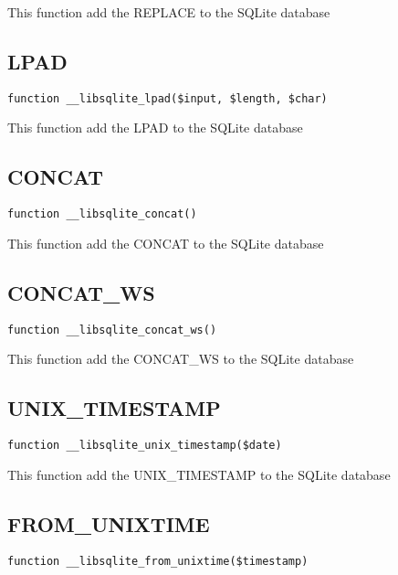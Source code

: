 \documentclass[a4paper]{book}
\begin{document}
This function add the REPLACE to the SQLite database

\hypertarget{toc334}{}
\subsection{LPAD}

\begin{lstlisting}
function __libsqlite_lpad($input, $length, $char)
\end{lstlisting}

This function add the LPAD to the SQLite database

\hypertarget{toc335}{}
\subsection{CONCAT}

\begin{lstlisting}
function __libsqlite_concat()
\end{lstlisting}

This function add the CONCAT to the SQLite database

\hypertarget{toc336}{}
\subsection{CONCAT\_WS}

\begin{lstlisting}
function __libsqlite_concat_ws()
\end{lstlisting}

This function add the CONCAT\_WS to the SQLite database

\hypertarget{toc337}{}
\subsection{UNIX\_TIMESTAMP}

\begin{lstlisting}
function __libsqlite_unix_timestamp($date)
\end{lstlisting}

This function add the UNIX\_TIMESTAMP to the SQLite database

\hypertarget{toc338}{}
\subsection{FROM\_UNIXTIME}

\begin{lstlisting}
function __libsqlite_from_unixtime($timestamp)
\end{lstlisting}
\end{document}
